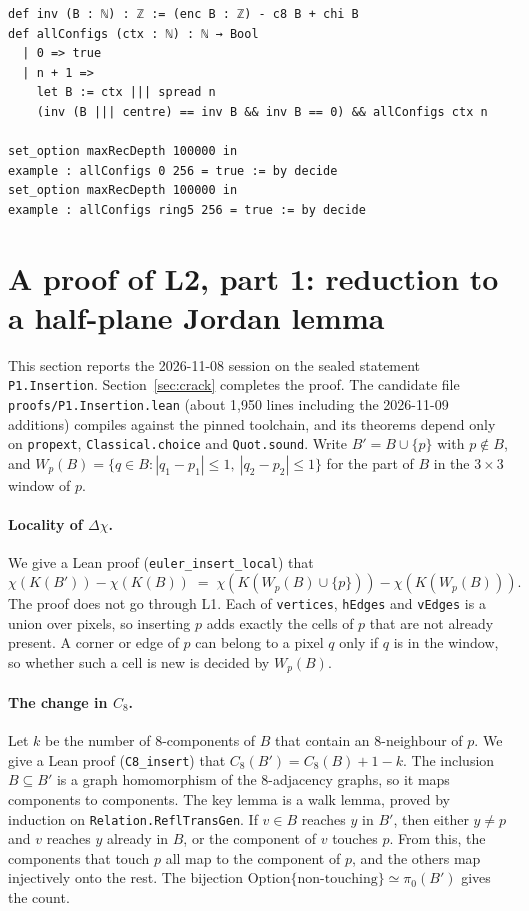 \documentclass[11pt]{article}
\theoremstyle{definition}
\theoremstyle{remark}
\begin{document}
\begin{lstlisting}[caption={The exhaustive configuration check (excerpt from the \texttt{Mask} namespace).},label={lst:mask}]
def inv (B : ℕ) : ℤ := (enc B : ℤ) - c8 B + chi B
def allConfigs (ctx : ℕ) : ℕ → Bool
  | 0 => true
  | n + 1 =>
    let B := ctx ||| spread n
    (inv (B ||| centre) == inv B && inv B == 0) && allConfigs ctx n

set_option maxRecDepth 100000 in
example : allConfigs 0 256 = true := by decide
set_option maxRecDepth 100000 in
example : allConfigs ring5 256 = true := by decide
\end{lstlisting}

\section{A proof of L2, part 1: reduction to a half-plane Jordan lemma}\label{sec:reduction}

This section reports the 2026-11-08 session on the sealed statement
\texttt{P1.Insertion}. Section~\ref{sec:crack} completes the proof. The candidate file
\texttt{proofs/P1.Insertion.lean} (about 1{,}950 lines including the 2026-11-09
additions) compiles against the pinned toolchain, and its theorems depend only on
\texttt{propext}, \texttt{Classical.choice} and \texttt{Quot.sound}. Write $B' = B\cup\{p\}$ with $p\notin B$, and
$W_p(B) = \{q\in B : |q_1-p_1|\le1,\ |q_2-p_2|\le1\}$ for the part of $B$ in the
$3\times3$ window of $p$.

\paragraph{Locality of $\Delta\chi$.} We give a Lean proof (\texttt{euler\_insert\_local}) that
\[
  \chi(K(B')) - \chi(K(B)) \;=\; \chi(K(W_p(B)\cup\{p\})) - \chi(K(W_p(B))).
\]
The proof does not go through L1. Each of \texttt{vertices}, \texttt{hEdges} and
\texttt{vEdges} is a union over pixels, so inserting $p$ adds exactly the cells of
$p$ that are not already present. A corner or edge of $p$ can belong to a pixel $q$
only if $q$ is in the window, so whether such a cell is new is decided by $W_p(B)$.

\paragraph{The change in $C_8$.} Let $k$ be the number of 8-components of $B$ that
contain an 8-neighbour of $p$. We give a Lean proof (\texttt{C8\_insert}) that
$C_8(B') = C_8(B) + 1 - k$. The inclusion $B\subseteq B'$ is a graph homomorphism of the
8-adjacency graphs, so it maps components to components. The key lemma is a walk
lemma, proved by induction on \texttt{Relation.ReflTransGen}. If $v\in B$ reaches
$y$ in $B'$, then either $y\ne p$ and $v$ reaches $y$ already in $B$, or the component
of $v$ touches $p$. From this, the components that touch $p$ all map to the
component of $p$, and the others map injectively onto the rest. The bijection
$\mathrm{Option}\{\text{non-touching}\}\simeq \pi_0(B')$ gives the count.
\end{document}
